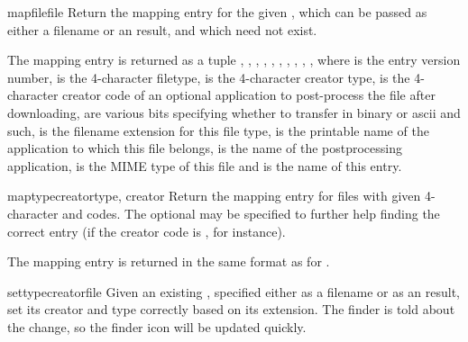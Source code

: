 \begin{methoddesc}{mapfile}{file}
Return the mapping entry for the given , which can be passed
as either a filename or an  result, and which
need not exist.

The mapping entry is returned as a tuple \code{(},
, , , ,
, , , ,
\code{)}, where  is the entry version
number,  is the 4-character filetype,  is the
4-character creator type,  is the 4-character creator
code of an
optional application to post-process the file after downloading,
 are various bits specifying whether to transfer in binary
or ascii and such,  is the filename extension for this
file type,  is the printable name of the application to
which this file belongs,  is the name of the
postprocessing application,  is the MIME type of this
file and  is the name of this entry.
\end{methoddesc}

\begin{methoddesc}{maptypecreator}{type, creator}
Return the mapping entry for files with given 4-character  and
 codes. The optional  may be specified to
further help finding the correct entry (if the creator code is
, for instance).

The mapping entry is returned in the same format as for .
\end{methoddesc}

\begin{methoddesc}{settypecreator}{file}
Given an existing , specified either as a filename or as an
 result, set its creator and type correctly based
on its extension.  The finder is told about the change, so the finder
icon will be updated quickly.
\end{methoddesc}
